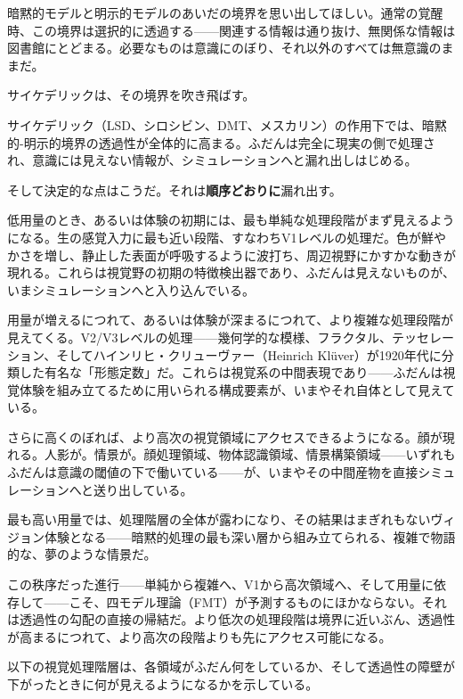 \documentclass[11pt, twoside, openright]{book}
\begin{document}
暗黙的モデルと明示的モデルのあいだの境界を思い出してほしい。通常の覚醒時、この境界は選択的に透過する------関連する情報は通り抜け、無関係な情報は図書館にとどまる。必要なものは意識にのぼり、それ以外のすべては無意識のままだ。

サイケデリックは、その境界を吹き飛ばす。

サイケデリック（LSD、シロシビン、DMT、メスカリン）の作用下では、暗黙的-明示的境界の透過性が全体的に高まる。ふだんは完全に現実の側で処理され、意識には見えない情報が、シミュレーションへと漏れ出しはじめる。

そして決定的な点はこうだ。それは\textbf{順序どおりに}漏れ出す。

低用量のとき、あるいは体験の初期には、最も単純な処理段階がまず見えるようになる。生の感覚入力に最も近い段階、すなわちV1レベルの処理だ。色が鮮やかさを増し、静止した表面が呼吸するように波打ち、周辺視野にかすかな動きが現れる。これらは視覚野の初期の特徴検出器であり、ふだんは見えないものが、いまシミュレーションへと入り込んでいる。

用量が増えるにつれて、あるいは体験が深まるにつれて、より複雑な処理段階が見えてくる。V2/V3レベルの処理------幾何学的な模様、フラクタル、テッセレーション、そしてハインリヒ・クリューヴァー（Heinrich Klüver）が1920年代に分類した有名な「形態定数」だ。これらは視覚系の中間表現であり------ふだんは視覚体験を組み立てるために用いられる構成要素が、いまやそれ自体として見えている。

さらに高くのぼれば、より高次の視覚領域にアクセスできるようになる。顔が現れる。人影が。情景が。顔処理領域、物体認識領域、情景構築領域------いずれもふだんは意識の閾値の下で働いている------が、いまやその中間産物を直接シミュレーションへと送り出している。

最も高い用量では、処理階層の全体が露わになり、その結果はまぎれもないヴィジョン体験となる------暗黙的処理の最も深い層から組み立てられる、複雑で物語的な、夢のような情景だ。

この秩序だった進行------単純から複雑へ、V1から高次領域へ、そして用量に依存して------こそ、四モデル理論（FMT）が予測するものにほかならない。それは透過性の勾配の直接の帰結だ。より低次の処理段階は境界に近いぶん、透過性が高まるにつれて、より高次の段階よりも先にアクセス可能になる。

以下の視覚処理階層は、各領域がふだん何をしているか、そして透過性の障壁が下がったときに何が見えるようになるかを示している。
\end{document}
